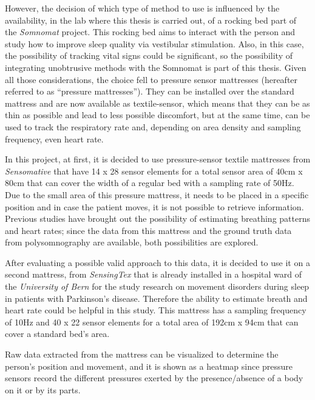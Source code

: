 However, the decision of which type of method to use is influenced by the availability, in the lab where this thesis is carried out, of a rocking bed part of the \textit{Somnomat}\cite{DevelopingSleep} project. This rocking bed aims to interact with the person and study how to improve sleep quality via vestibular stimulation. Also, in this case, the possibility of tracking vital signs could be significant, so the possibility of integrating unobtrusive methods with the Somnomat is part of this thesis.
Given all those considerations, the choice fell to pressure sensor mattresses (hereafter referred to as ``pressure mattresses'').
They can be installed over the standard mattress and are now available as textile-sensor, which means that they can be as thin as possible and lead to less possible discomfort, but at the same time, can be used to track the respiratory rate and, depending on area density and sampling frequency, even heart rate. 

In this project, at first, it is decided to use pressure-sensor textile mattresses from \textit{Sensomative} \cite{sensomativeUrl} that have 14 x 28 sensor elements for a total sensor area of 40cm x 80cm that can cover the width of a regular bed with a sampling rate of 50Hz. Due to the small area of this pressure mattress, it needs to be placed in a specific position and in case the patient moves, it is not possible to retrieve information. Previous studies have brought out the possibility of estimating breathing patterns and heart rates; since the data from this mattress and the ground truth data from polysomnography are available, both possibilities are explored.

After evaluating a possible valid approach to this data, it is decided to use it on a second mattress, from \textit{SensingTex} \cite{SensingConnectivity} that is already installed in a hospital ward of the \textit{University of Bern} for the study research on movement disorders during sleep in patients with Parkinson’s disease. Therefore the ability to estimate breath and heart rate could be helpful in this study.
This mattress has a sampling frequency of 10Hz and 40 x 22 sensor elements for a total area of 192cm x 94cm that can cover a standard bed's area.

Raw data extracted from the mattress can be visualized to determine the person's position and movement, and it is shown as a heatmap since pressure sensors record the different pressures exerted by the presence/absence of a body on it or by its parts. 

